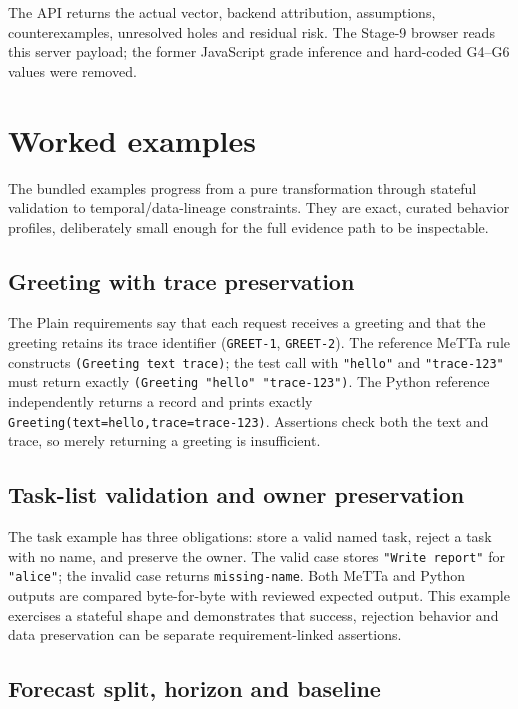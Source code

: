 \documentclass[11pt]{article}
\newcommand{\code}[1]{\texttt{#1}}
\begin{document}
The API returns the actual vector, backend attribution, assumptions,
counterexamples, unresolved holes and residual risk.  The Stage-9 browser reads
this server payload; the former JavaScript grade inference and hard-coded
G4--G6 values were removed.

\section{Worked examples}

The bundled examples progress from a pure transformation through stateful
validation to temporal/data-lineage constraints.  They are exact, curated
behavior profiles, deliberately small enough for the full evidence path to be
inspectable.

\subsection{Greeting with trace preservation}

The Plain requirements say that each request receives a greeting and that the
greeting retains its trace identifier (\code{GREET-1}, \code{GREET-2}).  The
reference MeTTa rule constructs \code{(Greeting text trace)}; the test call
with \code{"hello"} and \code{"trace-123"} must return exactly
\code{(Greeting "hello" "trace-123")}.  The Python reference independently
returns a record and prints exactly
\code{Greeting(text=hello,trace=trace-123)}.  Assertions check both the text
and trace, so merely returning a greeting is insufficient.

\subsection{Task-list validation and owner preservation}

The task example has three obligations: store a valid named task, reject a
task with no name, and preserve the owner.  The valid case stores
\code{"Write report"} for \code{"alice"}; the invalid case returns
\code{missing-name}.  Both MeTTa and Python outputs are compared byte-for-byte
with reviewed expected output.  This example exercises a stateful shape and
demonstrates that success, rejection behavior and data preservation can be
separate requirement-linked assertions.

\subsection{Forecast split, horizon and baseline}
\end{document}
